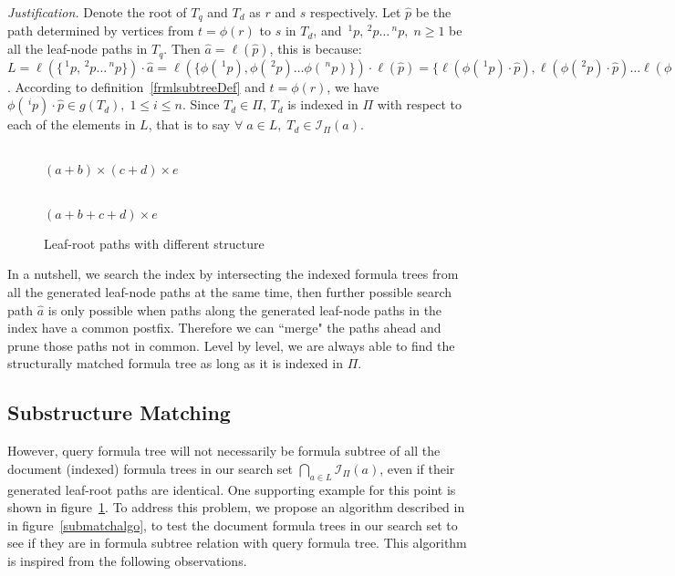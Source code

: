 \documentclass{acm_proc_article-sp}
\begin{document}
\textit{Justification.}
Denote the root of $T_q$ and $T_d$ as $r$ and $s$ respectively.
Let $\hat{p}$ be the path determined by vertices from $t=\phi(r)$ to $s$ in $T_d$,
and $\,^1p, \,^2p \ldots \,^np,\; n \ge 1$ be all the leaf-node paths in $T_q$.
Then $\hat{a} = \ell(\hat{p})$, this is because:
$L = \ell(\{ \,^1p, \,^2p \ldots \,^np \}) \cdot \hat{a} = 
\ell(\{ \phi(\,^1p), \phi(\,^2p) \ldots \phi(\,^np) \}) \cdot \ell(\hat{p}) =
\{ \ell(\phi(\,^1p) \cdot \hat{p}), \ell(\phi(\,^2p) \cdot \hat{p}) \ldots \ell(\phi(\,^np) \cdot \hat{p}) \}
$.
According to definition~\ref{frmlsubtreeDef} and $t=\phi(r)$, we have $\phi(\,^ip) \cdot \hat{p} \in g(T_d),\; 1 \le i \le n$.
Since $ T_d \in \Pi$, $T_d$ is indexed in $\Pi$ with respect to each of the elements in $L$, that is to say $\forall\; a \in L, \; T_d \in \mathcal{I}_{\Pi}(a)$.

\begin{figure}
\begin{minipage}[b]{1.65in}
\begin{center}
\\ $(a+b) \times (c+d) \times e$
\end{center}
\end{minipage}
\hspace*{.0in}
\begin{minipage}[b]{1.60in}
\begin{center}
\\ $(a+b+c+d) \times e$
\end{center}
\end{minipage}
\caption{Leaf-root paths with different structure}\label{notnecessary}
\end{figure}

In a nutshell, we search the index by intersecting the indexed formula trees from all the generated leaf-node paths at the same time, then further possible search path $\hat{a}$ is only possible when paths along the generated leaf-node paths in the index have a common postfix.
Therefore we can ``merge" the paths ahead and prune those paths not in common. Level by level, we are always able to find the structurally matched formula tree as long as it is indexed in $\Pi$.

\subsection{Substructure Matching}
However, query formula tree will not necessarily be formula subtree of all the document (indexed) formula trees in our search set
$\bigcap_{a \in L} \mathcal{I}_{\Pi}(a)$,
even if their generated leaf-root paths are identical.
One supporting example for this point is shown in figure~\ref{notnecessary}.
To address this problem, we propose an algorithm described in in figure~\ref{submatchalgo}, to test the document formula trees in our search set to see if they are in formula subtree relation with query formula tree.
This algorithm is inspired from the following observations. 
\end{document}
